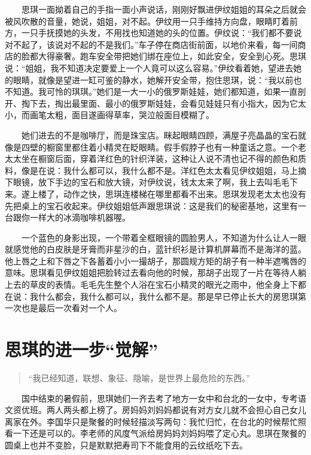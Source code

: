 \documentclass[12pt,UTF8]{ctexbook}
\begin{document}
　　思琪一面拗着自己的手指一面小声说话，刚刚好飘进伊纹姐姐的耳朵之后就会被风吹散的音量，她说，姐姐，对不起。伊纹用一只手维持方向盘，眼睛盯着前方，一只手抚摸她的头发，不用找也知道她的头的位置。伊纹说：\enquote{我们都不要说对不起了，该说对不起的不是我们。}车子停在商店街前面，以地价来看，每一间商店的脸都大得豪奢。跑车安全带把她们绑在座位上，如此安全，安全到心死。思琪说：\enquote{姐姐，我不知道决定要爱上一个人竟可以这么容易。}伊纹看着她，望进去她的眼睛，就像是望进一缸可鉴的静水，她解开安全带，抱住思琪，说：\enquote{我以前也不知道。我可怜的琪琪。}她们是一大一小的俄罗斯娃娃，她们都知道，如果一直剖开、掏下去，掏出最里面、最小的俄罗斯娃娃，会看见娃娃只有小指大，因为它太小，而画笔太粗，面目遂画得草率，哭泣般面目模糊了。

　　她们进去的不是咖啡厅，而是珠宝店。眯起眼睛四顾，满屋子亮晶晶的宝石就像是四壁的橱窗里都住着小精灵在眨眼睛。假手假脖子也有一种童话之意。一个老太太坐在橱窗后面，穿着洋红色的针织洋装，这种让人说不清也记不得的颜色和质料，像是在说：我什么都可以，我什么都不是。洋红色太太看见伊纹姐姐，马上摘下眼镜，放下手边的宝石和放大镜，对伊纹说，钱太太来了啊，我上去叫毛毛下来。遂上楼了，动作之快，思琪连楼梯在哪里都看不出来。思琪发现老太太也没有先把桌上的宝石收起来。伊纹姐姐低声跟思琪说：这是我们的秘密基地，这里有一台跟你一样大的冰滴咖啡机器喔。

　　一个蓝色的身影出现，一个带着全框眼镜的圆脸男人，不知道为什么让人一眼就感觉他的白皮肤是牙膏而非星沙的白，蓝针织衫是计算机屏幕而不是海洋的蓝。他上唇之上和下唇之下各蓄着小小一撮胡子，那圆规方矩的胡子有一种半遮嘴唇的意味。思琪看见伊纹姐姐把脸转过去看向他的时候，那胡子出现了一片在等待人躺上去的草皮的表情。毛毛先生整个人浴在宝石小精灵的眼光之雨中，他全身上下都在说：我什么都会，我什么都可以，我什么都不是。那是早已停止长大的房思琪第一次也是最后一次看对一个人。

\hypertarget{ux601dux742aux7684ux8fdbux4e00ux6b65ux89c9ux89e3}{%
\section*{\texorpdfstring{思琪的进一步\enquote{觉解}}{思琪的进一步``觉解''}}\label{ux601dux742aux7684ux8fdbux4e00ux6b65ux89c9ux89e3}}

\begin{quote}
\enquote{我已经知道，联想、象征、隐喻，是世界上最危险的东西。}
\end{quote}

　　国中结束的暑假前，思琪她们一齐去考了地方一女中和台北的一女中，专考语文资优班。两人两头都上榜了。房妈妈刘妈妈都说有对方女儿就不会担心自己女儿离家在外。李国华只是聚餐的时候轻描淡写两句：我忙归忙，在台北的时候帮忙照看一下还是可以的。李老师的风度气派给房妈妈刘妈妈喂了定心丸。思琪在聚餐的圆桌上也并不变脸，只是默默把寿司下不能食用的云纹纸吃下去。
\end{document}
